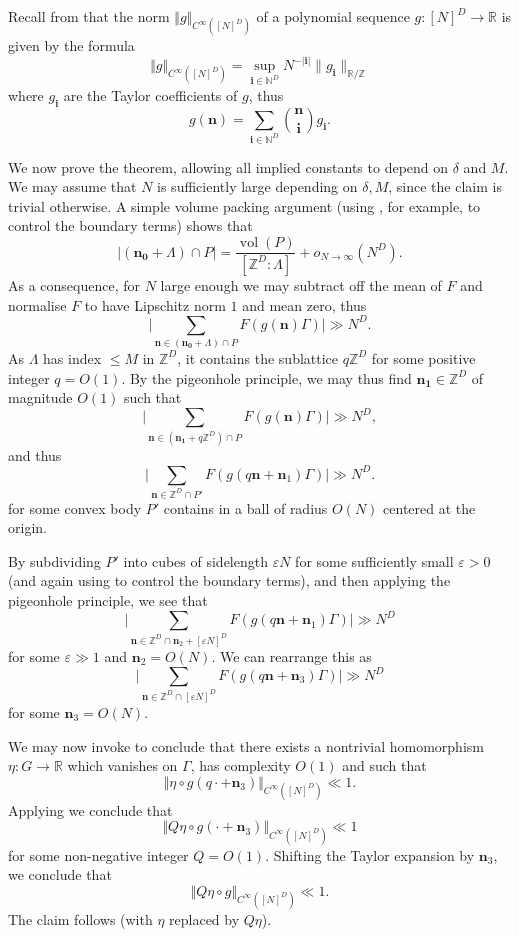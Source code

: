 \documentclass[11pt,reqno]{amsart}
\numberwithin{equation}{section}
\theoremstyle{plain}
\theoremstyle{definition}
\renewcommand{\leq}{\leqslant}
\newcommand\Z{\mathbb{Z}}
\newcommand\R{\mathbb{R}}
\newcommand\N{\mathbb{N}}
\newcommand\1{{\bf 1}}
\newcommand\2{{\bf 2}}
\newcommand\eps{\varepsilon}
\begin{document}
Recall from \cite[Definition 8.2]{green-tao-nilratner} that the norm $\Vert g\Vert_{C^\infty([N]^D)}$ of a polynomial sequence $g: [N]^D \to \R$ is given by the formula
$$ \Vert g\Vert_{C^\infty([N]^D)} = \sup_{{\mathbf i}\in \N^D} N^{-|{\mathbf i}|} \|g_{\mathbf i}\|_{\R/\Z}$$
where $g_{\mathbf i}$ are the Taylor coefficients of $g$, thus
$$ g({\mathbf n}) = \sum_{{\mathbf i}\in \N^D} \binom{\mathbf{n}}{\mathbf{i}} g_{\mathbf i}.$$

We now prove the theorem, allowing all implied constants to depend on $\delta$ and $M$.  We may assume that $N$ is sufficiently large depending on $\delta,M$, since the claim is trivial otherwise.  A simple volume packing argument (using \cite[Corollary A.2]{green-tao-linearprimes}, for example, to control the boundary terms) shows that
$$ |(\mathbf{n_0}+\Lambda) \cap P| = \frac{\operatorname{vol}(P)}{[\Z^D:\Lambda]} + o_{N \to \infty}(N^D).$$
As a consequence, for $N$ large enough we may subtract off the mean of $F$ and normalise $F$ to have Lipschitz norm $1$ and mean zero, thus
$$ \big| \sum_{{\mathbf n} \in (\mathbf{n_0}+\Lambda) \cap P} F(g({\mathbf{n}})\Gamma) \big| \gg N^D.$$
As $\Lambda$ has index $\leq M$ in $\Z^D$, it contains the sublattice $q\Z^D$ for some positive integer $q = O(1)$.  By the pigeonhole principle, we may thus find $\mathbf{n_1} \in \Z^D$ of magnitude $O(1)$ such that
$$ \big| \sum_{{\mathbf n} \in (\mathbf{n_1}+q\Z^D) \cap P} F(g({\mathbf{n}})\Gamma) \big| \gg N^D,$$
and thus
$$ \big| \sum_{{\mathbf n} \in \Z^D \cap P'} F(g(q{\mathbf{n}}+{\mathbf n_1})\Gamma) \big| \gg N^D.$$
for some convex body $P'$ contains in a ball of radius $O(N)$ centered at the origin.

By subdividing $P'$ into cubes of sidelength $\eps N$ for some sufficiently small $\eps > 0$ (and again using \cite[Corollary A.2]{green-tao-linearprimes} to control the boundary terms), and then applying the pigeonhole principle, we see that
$$ \big| \sum_{{\mathbf n} \in \Z^D \cap {\mathbf n_2} + [\eps N]^D} F(g(q{\mathbf{n}}+{\mathbf n_1})\Gamma) \big| \gg N^D$$
for some $\eps \gg 1$ and ${\mathbf n_2} = O(N)$.  We can rearrange this as
$$ \big| \sum_{{\mathbf n} \in \Z^D \cap [\eps N]^D} F(g(q{\mathbf{n}}+{\mathbf n_3})\Gamma) \big| \gg N^D$$
for some ${\mathbf n_3}=O(N)$.

We may now invoke \cite[Theorem 8.6]{green-tao-nilratner} to conclude that there exists a nontrivial homomorphism $\eta : G \rightarrow \R$ which vanishes on $\Gamma$, has complexity $O(1)$ and such that 
\[ \Vert \eta \circ g(q \cdot + {\mathbf n_3}) \Vert_{C^{\infty}([N]^D)} \ll 1.\]
Applying \cite[Lemma 8.4]{green-tao-nilratner} we conclude that
\[ \Vert Q \eta \circ g(\cdot + {\mathbf n_3}) \Vert_{C^{\infty}([N]^D)} \ll 1\]
for some non-negative integer $Q = O(1)$.  Shifting the Taylor expansion by ${\mathbf n_3}$, we conclude that
\[ \Vert Q \eta \circ g \Vert_{C^{\infty}([N]^D)} \ll 1.\]
The claim follows (with $\eta$ replaced by $Q\eta$).
\end{document}
